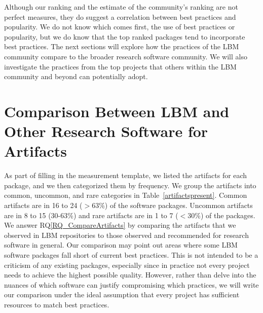 \documentclass[final, 3p, times, authoryear]{elsarticle}
\newcommand{\rqref}[1]{RQ\ref{#1}}
\begin{document}
Although our ranking and the estimate of the community's ranking are not perfect
measures, they do suggest a correlation between best practices and popularity.
We do not know which comes first, the use of best practices or popularity, but
we do know that the top ranked packages tend to incorporate best practices.  The
next sections will explore how the practices of the LBM community compare to the
broader research software community.  We will also investigate the practices
from the top projects that others within the LBM community and beyond can
potentially adopt.

\section{Comparison Between LBM and Other Research Software for Artifacts}
\label{Sec_CompareArtifacts}

As part of filling in the measurement template, we listed the artifacts for each
package, and we then categorized them by frequency. We group the artifacts into
common, uncommon, and rare categories in Table~\ref{artifactspresent}. Common
artifacts are in 16 to 24 ($>$63\%) of the software packages. Uncommon artifacts
are in 8 to 15 (30-63\%) and rare artifacts are in 1 to 7 ($<$30\%) of the
packages.  We answer \rqref{RQ_CompareArtifacts} by comparing the artifacts that
we observed in LBM repositories to those observed and recommended for research
software in general. Our comparison may point out areas where some LBM software
packages fall short of current best practices. This is not intended to be a
criticism of any existing packages, especially since in practice not every
project needs to achieve the highest possible quality. However, rather than
delve into the nuances of which software can justify compromising which
practices, we will write our comparison under the ideal assumption that every
project has sufficient resources to match best practices.
\end{document}
